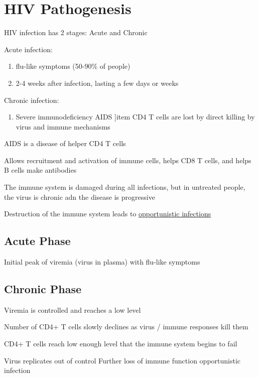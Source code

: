 \documentclass{notes}
\begin{document}


\section{HIV Pathogenesis}

HIV infection has 2 stages: Acute and Chronic

Acute infection:

\begin{enumerate}
    \item flu-like symptoms (50-90\% of people)
    \item 2-4 weeks after infection, lasting a few days or weeks
\end{enumerate}

Chronic infection:

\begin{enumerate}
    \item Severe immunodeficiency \indicates AIDS
    ]item CD4 T cells are lost by direct killing by virus and immune mechanisms
\end{enumerate}

AIDS is a disease of helper CD4 T cells

\tab Allows recruitment and activation of immune cells, helps CD8 T cells, and helps B cells make antibodies

The immune system is damaged during all infections, but in untreated people, the virus is chronic adn the disease is progressive

Destruction of the immune system leads to \underline{opportunistic infections}

\subsection{Acute Phase}

Initial peak of viremia (virus in plasma) with flu-like symptoms

\subsection{Chronic Phase}

Viremia is controlled and reaches a low level

Number of CD4+ T cells slowly declines as virus / immune responses kill them

\tab CD4+ T cells reach low enough level that the immune system begins to fail

\tab Virus replicates out of control \indicates Further loss of immune function \indicates opportunistic infection

\end{document}
